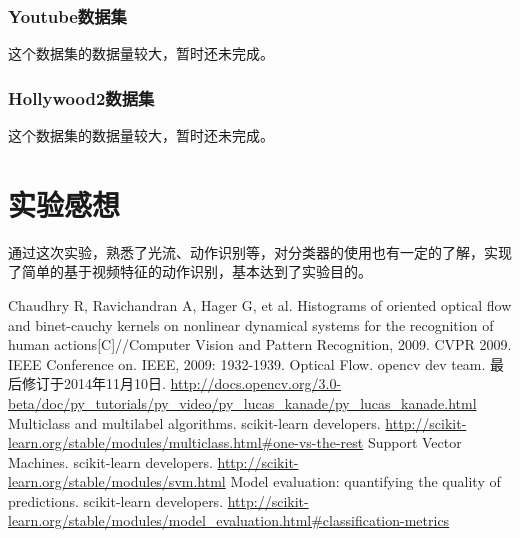 \documentclass[a4paper, 12pt, UTF8]{article}
\begin{document}
\subsubsection{Youtube数据集}

这个数据集的数据量较大，暂时还未完成。

\subsubsection{Hollywood2数据集}

这个数据集的数据量较大，暂时还未完成。

\section{实验感想}

通过这次实验，熟悉了光流、动作识别等，对分类器的使用也有一定的了解，实现了简单的基于视频特征的动作识别，基本达到了实验目的。


\renewcommand{\refname}{参考}
\begin{thebibliography}{9}
 Chaudhry R, Ravichandran A, Hager G, et al. Histograms of oriented optical flow and binet-cauchy kernels on nonlinear dynamical systems for the recognition of human actions[C]//Computer Vision and Pattern Recognition, 2009. CVPR 2009. IEEE Conference on. IEEE, 2009: 1932-1939.
 Optical Flow. opencv dev team. 最后修订于2014年11月10日.  \url{http://docs.opencv.org/3.0-beta/doc/py_tutorials/py_video/py_lucas_kanade/py_lucas_kanade.html}
 Multiclass and multilabel algorithms. scikit-learn developers. \url{http://scikit-learn.org/stable/modules/multiclass.html#one-vs-the-rest}
 Support Vector Machines. scikit-learn developers. \url{http://scikit-learn.org/stable/modules/svm.html}
 Model evaluation: quantifying the quality of predictions. scikit-learn developers. \url{http://scikit-learn.org/stable/modules/model_evaluation.html#classification-metrics}
\end{thebibliography}
\end{document}
